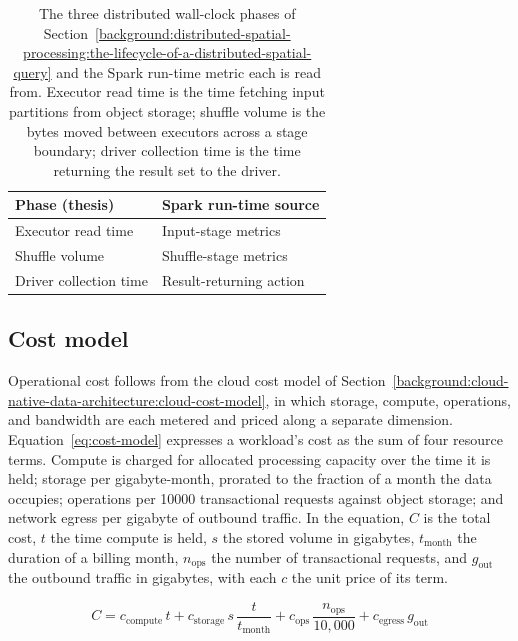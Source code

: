 \begin{table}[H]
	\centering
	\begin{tabular}{@{}ll@{}}
		\toprule
		Phase (thesis) & Spark run-time source \\
		\midrule
		Executor read time & Input-stage metrics \\
		Shuffle volume & Shuffle-stage metrics \\
		Driver collection time & Result-returning action \\
		\bottomrule
	\end{tabular}
	\caption[Distributed phase metrics and their Spark run-time sources.]{The three distributed wall-clock phases of Section~\ref{background:distributed-spatial-processing:the-lifecycle-of-a-distributed-spatial-query} and the Spark run-time metric each is read from. Executor read time is the time fetching input partitions from object storage; shuffle volume is the bytes moved between executors across a stage boundary; driver collection time is the time returning the result set to the driver.}
	\label{tab:distributed-phase-metrics}
\end{table}

\subsection{Cost model}
\label{research-design-and-methodology:metrics-and-cost-model:cost-model}

Operational cost follows from the cloud cost model of Section~\ref{background:cloud-native-data-architecture:cloud-cost-model}, in which storage, compute, operations, and bandwidth are each metered and priced along a separate dimension. Equation~\ref{eq:cost-model} expresses a workload's cost as the sum of four resource terms. Compute is charged for allocated processing capacity over the time it is held; storage per gigabyte-month, prorated to the fraction of a month the data occupies; operations per \num{10000} transactional requests against object storage; and network egress per gigabyte of outbound traffic. In the equation, $C$ is the total cost, $t$ the time compute is held, $s$ the stored volume in gigabytes, $t_{\text{month}}$ the duration of a billing month, $n_{\text{ops}}$ the number of transactional requests, and $g_{\text{out}}$ the outbound traffic in gigabytes, with each $c$ the unit price of its term.

\begin{equation}
	C = c_{\text{compute}}\, t + c_{\text{storage}}\, s \, \frac{t}{t_{\text{month}}} + c_{\text{ops}}\, \frac{n_{\text{ops}}}{10{,}000} + c_{\text{egress}}\, g_{\text{out}}
	\label{eq:cost-model}
\end{equation}

